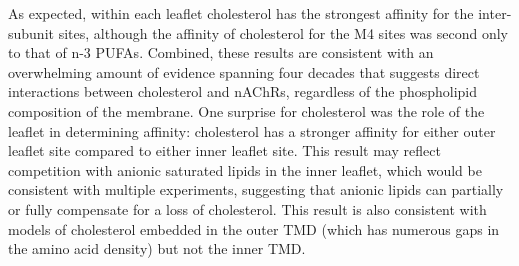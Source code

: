 \documentclass[%
 aip,
 amsmath,amssymb,
 preprint,%
]{revtex4-1}\usepackage{setspace}
\newcommand{\nachr}{nAChR}
\newcommand{\plgic}{pLGIC}
\begin{document}
As expected, within each leaflet cholesterol has the strongest affinity for the inter-subunit sites, although the affinity of cholesterol for the M4 sites was second only to that of n-3 PUFAs. Combined, these results are consistent with an overwhelming amount of evidence spanning four decades that suggests direct interactions between cholesterol and \nachr s, regardless of the phospholipid composition of the membrane.  One surprise for cholesterol was the role of the leaflet in determining affinity: cholesterol has a stronger affinity for either outer leaflet site compared to either inner leaflet site. This result may reflect competition with anionic saturated lipids in the inner leaflet, which would be consistent with multiple experiments\cite{Baenziger2000,Wenz2005,Hamouda2006,Thompson2020}, suggesting that anionic lipids can partially or fully compensate for a loss of cholesterol.  This result is also consistent with models of cholesterol embedded\cite{Brannigan2008} in the outer TMD (which has numerous gaps in the amino acid density) but not the inner TMD. 
\end{document}

